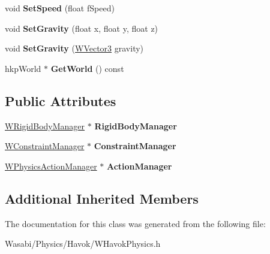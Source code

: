 \begin{DoxyCompactItemize}
\item 
void {\bfseries Set\+Speed} (float f\+Speed)\hypertarget{class_w_havok_physics_a0f8ee19f8059c3523bb13365a9dac2eb}{}\label{class_w_havok_physics_a0f8ee19f8059c3523bb13365a9dac2eb}

\item 
void {\bfseries Set\+Gravity} (float x, float y, float z)\hypertarget{class_w_havok_physics_a6c4acd67eee6137e8e10f19d59bc4d9e}{}\label{class_w_havok_physics_a6c4acd67eee6137e8e10f19d59bc4d9e}

\item 
void {\bfseries Set\+Gravity} (\hyperlink{class_w_vector3}{W\+Vector3} gravity)\hypertarget{class_w_havok_physics_addc51687bdc1560201087f9c83d0d9d7}{}\label{class_w_havok_physics_addc51687bdc1560201087f9c83d0d9d7}

\item 
hkp\+World $\ast$ {\bfseries Get\+World} () const \hypertarget{class_w_havok_physics_a37bf1b9720f4911fdad4a2db6fa9bf26}{}\label{class_w_havok_physics_a37bf1b9720f4911fdad4a2db6fa9bf26}

\end{DoxyCompactItemize}
\subsection*{Public Attributes}
\begin{DoxyCompactItemize}
\item 
\hyperlink{class_w_rigid_body_manager}{W\+Rigid\+Body\+Manager} $\ast$ {\bfseries Rigid\+Body\+Manager}\hypertarget{class_w_havok_physics_a309d28f412bca9fa9e397b3c1cad8be4}{}\label{class_w_havok_physics_a309d28f412bca9fa9e397b3c1cad8be4}

\item 
\hyperlink{class_w_constraint_manager}{W\+Constraint\+Manager} $\ast$ {\bfseries Constraint\+Manager}\hypertarget{class_w_havok_physics_a03639c9749e52a8b005289d04991a5f6}{}\label{class_w_havok_physics_a03639c9749e52a8b005289d04991a5f6}

\item 
\hyperlink{class_w_physics_action_manager}{W\+Physics\+Action\+Manager} $\ast$ {\bfseries Action\+Manager}\hypertarget{class_w_havok_physics_a8c50706f6512a4b746e12b409326e9c5}{}\label{class_w_havok_physics_a8c50706f6512a4b746e12b409326e9c5}

\end{DoxyCompactItemize}
\subsection*{Additional Inherited Members}


The documentation for this class was generated from the following file\+:\begin{DoxyCompactItemize}
\item 
Wasabi/\+Physics/\+Havok/W\+Havok\+Physics.\+h\end{DoxyCompactItemize}
